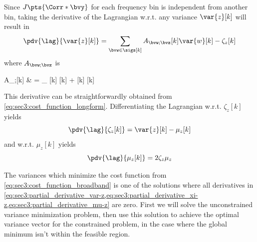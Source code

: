 Since $J\pts{\Corr*{\bvy}}$ for each frequency bin is independent from another bin, taking the derivative of the Lagrangian w.r.t. any variance $\var{z}[k]$ will result in
\begin{equation}
	\label{eq:sec3:partial_derivative_var-z}
	\pdv{\lag}{\var{z}[k]} = \sum_{\bvw\in\sigs[k]} A_{\bvw;\bvz}[k] \var{w}[k] - \zeta_{z}[k]
\end{equation}
where  $A_{\bvw;\bvz}$ is
\begin{equations}
	A_{\bvw;\bvz}[k]
	& = \sum_{\bvj}   +   \\
\end{equations}
This derivative can be straightforwardly obtained from \cref{eq:sec3:cost_function_longform}. Differentiating the Lagrangian w.r.t. $\zeta_{z}[k]$ yields
\begin{equation}
	\label{eq:sec3:partial_derivative_xi-z}
	\pdv{\lag}{\zeta_{z}[k]} = \var{z}[k] - \mu_{z}[k]
\end{equation}
and w.r.t. $\mu_{z}[k]$ yields
\begin{equation}
	\label{eq:sec3:partial_derivative_mu-z}
	\pdv{\lag}{\mu_{z}[k]} = 2\zeta_{z}\mu_{z}
\end{equation}

The variances which minimize the cost function from \cref{eq:sec3:cost_function_broadband} is one of the solutions where all derivatives in \cref{eq:sec3:partial_derivative_var-z,eq:sec3:partial_derivative_xi-z,eq:sec3:partial_derivative_mu-z} are zero. First we will solve the unconstrained variance minimization problem, then use this solution to achieve the optimal variance vector for the constrained problem, in the case where the global minimum isn't within the feasible region.

